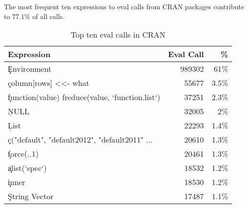 \documentclass[screen,acmsmall]{acmart}
\begin{document}
The most frequent ten expressions to eval calls from CRAN packages
contribute to 77.1\% of all \eval calls.

\begin{table}[!h]  \centering
\begin{tabular}{@{}l@{~}|@{~}r@{~}r@{}} \hline
Expression & Eval Call &  \% \\\hline
\c{Environment} &                                  989302   & 61\%\\
\c{column[rows] <<- what} &                        55677    & 3.5\%\\
\c{function(value) freduce(value, `function.list`)} & 37251& 2.3\%\\
\c{NULL} &                         32005    & 2\%\\
\c{List} &                         22293    & 1.4\%\\
\c{c("default", "default2012", "default2011" ...}& 20610    & 1.3\%\\
\c{force(..1)}            &                        20461    & 1.3\%\\
\c{alist(`spec`)}       &                         18532    & 1.2\%\\
\c{inner}               &                          18530    & 1.2\%\\
\c{String Vector}      &                           17487     & 1.1\%\\
\end{tabular}\caption{Top ten eval calls in CRAN} \label{C}
\end{table}
\end{document}
